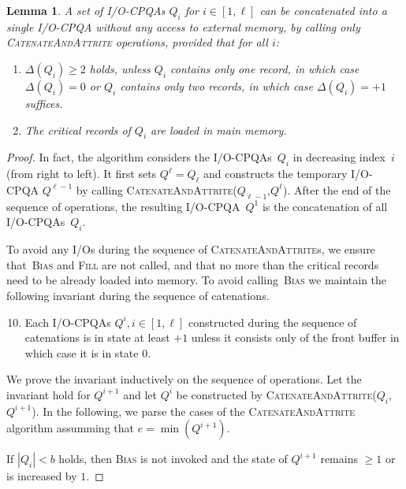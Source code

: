 \documentclass{sig-alternate}
\newtheorem{lemma}{Lemma}
\renewcommand{\(}{\left(}
\renewcommand{\)}{\right)}
\begin{document}
\begin{lemma} \label{lem:seq_concats}
  A set of I/O-CPQAs $Q_{i}$ for $i\in[1,\ell]$ can be concatenated into a
  single I/O-CPQA without any access to external memory, by calling only
  \textsc{CatenateAndAttrite} operations, provided that for all $i$:
  \begin{enumerate}
    \item $\Delta (Q_{i})\geq 2$ holds, unless $Q_{i}$ contains only one
      record, in which case $\Delta (Q_{i})=0$ or $Q_{i}$ contains only two
      records, in which case $\Delta (Q_{i})=+1$ suffices.

    \item The critical records of $Q_i$ are loaded in main memory.
  \end{enumerate}
\end{lemma}
\begin{fullenv}
\begin{proof}
In fact, the algorithm considers the I/O-CPQAs~$Q_{i}$ in decreasing index~$i$
(from right to left). It first sets $Q^{\ell}=Q_\ell$ and constructs the
temporary I/O-CPQA $Q^{\ell-1}$ by calling
\textsc{CatenateAndAttrite}($Q_{\ell-1}$,$Q^{\ell}$). After the end of the
sequence of operations, the resulting I/O-CPQA~$Q^{1}$ is the concatenation of
all I/O-CPQAs~$Q_{i}$.

To avoid any I/Os during the sequence of \textsc{CatenateAndAttrite}s, we
ensure that~\textsc{Bias} and \textsc{Fill} are not called, and that no more
than the critical records need to be already loaded into memory. 
To avoid calling~\textsc{Bias} we maintain the following invariant during the
sequence of catenations.

\begin{enumerate}[label=I.\arabic*)]
  \setcounter{enumi}{9}
  \item \label{in:seq_cat} Each I/O-CPQAs $Q^{i},i\in[1,\ell]$ constructed
    during the sequence of catenations is in state at least $+1$ unless it
    consists only of the front buffer in which case it is in state $0$.
\end{enumerate}

We prove the invariant inductively on the sequence of operations. Let the
invariant hold for $Q^{i+1}$ and let $Q^{i}$ be constructed by
\textsc{CatenateAndAttrite}($Q_{i}$,$Q^{i+1}$). In the following, we parse the
cases of the \textsc{CatenateAndAttrite} algorithm assumming that
$e=\min(Q^{i+1})$.

If $|Q_i| < b$ holds, then \textsc{Bias} is not invoked and the state of
$Q^{i+1}$ remains $\geq 1$ or is increased by $1$.


\end{proof}
\end{fullenv}
\end{document}
